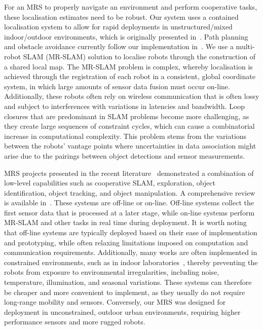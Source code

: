 
For an MRS to properly navigate an environment and perform cooperative tasks, these localisation estimates need to be robust. Our system uses a contained localisation system to allow for rapid deployments in unstructured/mixed indoor/outdoor environments, which is originally presented in~\cite{reid_large-scale_2016}. Path planning and obstacle avoidance currently follow our implementation in~\cite{a._boeing_real-time_2012, a._boeing_cooperative_2011}. We use a multi-robot SLAM (MR-SLAM) solution to localise robots through the construction of a shared local map. The MR-SLAM problem is complex, whereby localisation is achieved through the registration of each robot in a consistent, global coordinate system, in which large amounts of sensor data fusion must occur on-line. Additionally, these robots often rely on wireless communication that is often lossy and subject to interferences with variations in latencies and bandwidth. Loop closures that are predominant in SLAM problems become more challenging, as they create large sequences of constraint cycles, which can cause a combinatorial increase in computational complexity. This problem stems from the variations between the robots' vantage points where uncertainties in data association might arise due to the pairings between object detections and sensor measurements.


MRS projects presented in the recent literature~\cite{luft_recursive_2018, garzon_multirobot_2016, best_dec-mcts:_2018} demonstrated a combination of low-level capabilities such as cooperative SLAM, exploration, object identification, object tracking, and object manipulation. A comprehensive review is available in~\cite{saeedi_multiple-robot_2016, abdulgalil_multi-robot_2019}. These systems are off-line or on-line. Off-line systems collect the first sensor data that is processed at a later stage, while on-line systems perform MR-SLAM and other tasks in real time during deployment. It is worth noting that off-line systems are typically deployed based on their ease of implementation and prototyping, while often relaxing limitations imposed on computation and communication requirements. Additionally, many works are often implemented in constrained environments, such as in indoor laboratories~\cite{jung_development_2015, koch_multi-robot_2016}, thereby preventing the robots from exposure to environmental irregularities, including noise, temperature, illumination, and seasonal variations. These systems can therefore be cheaper and more convenient to implement, as they usually do not require long-range mobility and sensors. Conversely, our MRS was designed for deployment in unconstrained, outdoor urban environments, requiring higher performance sensors and more rugged robots.

